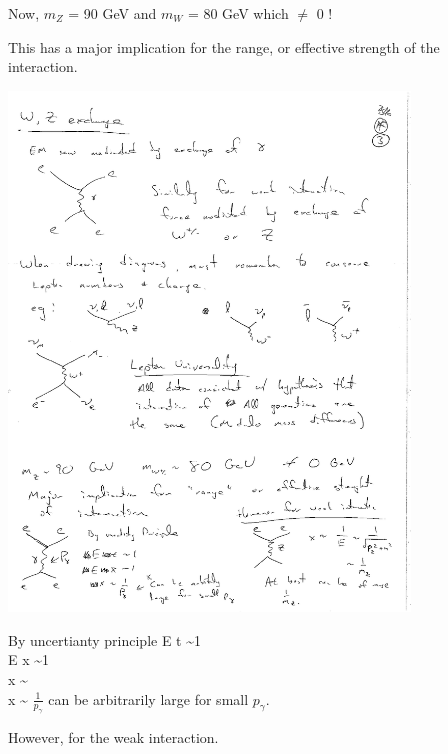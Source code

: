 {\clearpage


\bc
Now, $m_Z$ = 90 GeV and $m_W$ = 80 GeV  which $\ne$ 0 !
\ec

This has a major implication for the range, or effective strength of the interaction.


\begin{minipage}{0.4\textwidth}
\includegraphics[width=0.8\textwidth]{./eeGamma.pdf}   
\end{minipage} %
\begin{minipage}{0.45\textwidth}
By uncertianty principle 
\bea
E \times t \sim 1 \\
E \times x \sim 1 \\
x \sim {} \\ 
x \sim {}
\eea
$\frac{1}{p_\gamma}$ can be arbitrarily large for small $p_\gamma$.
\end{minipage} %



However, for the weak interaction. 

}
